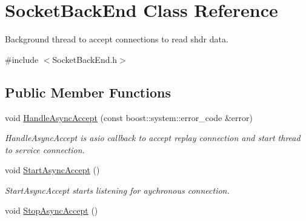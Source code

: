 \hypertarget{class_socket_back_end}{}\section{Socket\+Back\+End Class Reference}
\label{class_socket_back_end}


Background thread to accept connections to read shdr data.  




{\ttfamily \#include $<$Socket\+Back\+End.\+h$>$}

\subsection*{Public Member Functions}
\begin{DoxyCompactItemize}
\item 
void \hyperlink{class_socket_back_end_a35e3d5444f229bbc20e8258d96142fcd}{Handle\+Async\+Accept} (const boost\+::system\+::error\+\_\+code \&error)
\begin{DoxyCompactList}\small\item\em Handle\+Async\+Accept is asio callback to accept replay connection and start thread to service connection. \end{DoxyCompactList}\item 
\hypertarget{class_socket_back_end_add5a2d229fd8fd5fbf9f0dfcad570281}{}void \hyperlink{class_socket_back_end_add5a2d229fd8fd5fbf9f0dfcad570281}{Start\+Async\+Accept} ()\label{class_socket_back_end_add5a2d229fd8fd5fbf9f0dfcad570281}

\begin{DoxyCompactList}\small\item\em Start\+Async\+Accept starts listening for aychronous connection. \end{DoxyCompactList}\item 
\hypertarget{class_socket_back_end_a4834fef4e9faaa0f17b48735d3fa4244}{}void \hyperlink{class_socket_back_end_a4834fef4e9faaa0f17b48735d3fa4244}{Stop\+Async\+Accept} ()\label{class_socket_back_end_a4834fef4e9faaa0f17b48735d3fa4244}


\end{DoxyCompactItemize}
